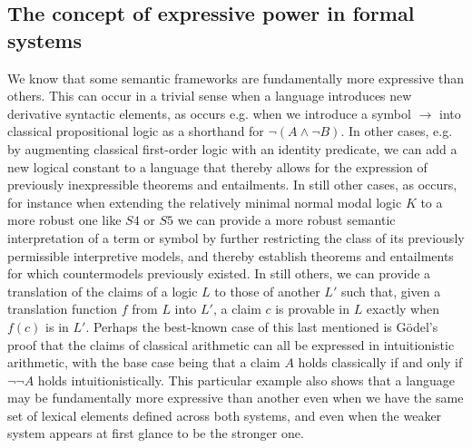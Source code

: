 \documentclass[]{article}
\begin{document}
\subsection{The concept of expressive power in formal systems}
We know that some semantic frameworks are fundamentally more expressive than others. 
This can occur in a trivial sense when a language introduces new derivative syntactic elements, 
as occurs e.g. when we introduce a symbol $\rightarrow$ into classical propositional logic 
as a shorthand for $\neg(A \wedge \neg B)$. 
In other cases, e.g. by augmenting classical first-order logic with an identity predicate, 
we can add a new logical constant to a language that thereby allows for the expression of previously inexpressible theorems and entailments. 
In still other cases, 
as occurs, for instance when extending the relatively minimal normal modal logic $K$ to a more robust one like $S4$ or $S5$
we can provide a more robust semantic interpretation of a term or symbol by further restricting the class of its previously permissible interpretive models, 
and thereby establish theorems and entailments for which countermodels previously existed.
In still others, we can provide a translation of the claims of a logic $L$ to those of another $L'$ 
such that, 
given a translation function $f$ from $L$ into $L'$, 
a claim $c$ is provable in $L$ exactly when  $f(c)$ is in $L'$.
Perhaps the best-known case of this last mentioned is G\"{o}del's proof that the claims of classical arithmetic can all be expressed in intuitionistic arithmetic, 
with the base case being that a claim $A$ holds classically if and only if $\neg\neg A$ holds intuitionistically. 
This particular example also shows that a language may be fundamentally more expressive than another even when we have the same set of lexical elements defined across both systems, 
and even when the weaker system appears at first glance to be the stronger one. 
\end{document}
